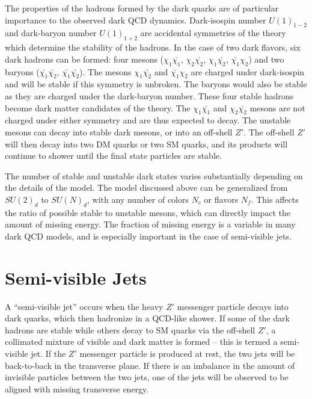 The properties of the hadrons formed by the dark quarks are of particular importance to the observed dark QCD dynamics. Dark-isospin number $U(1)_{1-2}$ and dark-baryon number $U(1)_{1+2}$ are accidental symmetries of the theory which determine the stability of the hadrons. In the case of two dark flavors, six dark hadrons can be formed: four mesons ($\chi_1\bar{\chi_1}$, $\chi_2\bar{\chi_2}$, $\chi_1\bar{\chi_2}$, $\bar{\chi_1}\chi_2$) and two baryons ($\bar{\chi_1}\bar{\chi_2}$, $\bar{\chi_1}\bar{\chi_2}$). The mesons $\chi_1\bar{\chi_2}$ and $\bar{\chi_1}\chi_2$ are charged under dark-isospin and will be stable if this symmetry is unbroken. The baryons would also be stable as they are charged under the dark-baryon number. These four stable hadrons become dark matter candidates of the theory. The $\chi_1\bar{\chi_1}$ and $\chi_2\bar{\chi_2}$ mesons are not charged under either symmetry and are thus expected to decay. The unstable mesons can decay into stable dark mesons, or into an off-shell $Z'$. The off-shell $Z'$ will then decay into two DM quarks or two SM quarks, and its products will continue to shower until the final state particles are stable.\par

The number of stable and unstable dark states varies substantially depending on the details of the model. The model discussed above can be generalized from $SU(2)_d$ to $SU(N)_d$, with any number of colors $N_c$ or flavors $N_f$. This affects the ratio of possible stable to unstable mesons, which can directly impact the amount of missing energy. The fraction of missing energy is a variable in many dark QCD models, and is especially important in the case of semi-visible jets.

\section{Semi-visible Jets}
\label{sec:semivisiblejets}

A ``semi-visible jet'' occurs when the heavy $Z'$ messenger particle decays into dark quarks, which then hadronize in a QCD-like shower. If some of the dark hadrons are stable while others decay to SM quarks via the off-shell $Z'$, a collimated mixture of visible and dark matter is formed – this is termed a semi-visible jet. If the $Z'$ messenger particle is produced at rest, the two jets will be back-to-back in the transverse plane. If there is an imbalance in the amount of invisible particles between the two jets, one of the jets will be observed to be aligned with missing transverse energy. \par

